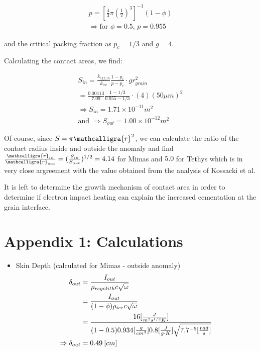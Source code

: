 \documentclass[11pt]{article} %
\newcommand{\sr}{\ensuremath{\mathcalligra{r}} \xspace}
\begin{document}
	\begin{equation}
	\begin{gathered}
	p = [ \frac{4}{3} \pi ( \frac{1}{2})^{3} ]^{-1} (1 - \phi) \\
	\Rightarrow \text{for } \phi = 0.5 \text{, } p = 0.955
	\end{gathered}
	\end{equation}
	
	and the critical packing fraction as $p_{c} = 1/3$ and $g = 4$. 
	
	Calculating the contact areas, we find:
	
	\begin{equation}
	\begin{gathered}
	S_{in} = \frac{k_{eff, in}}{k_{ice}} \frac{1-p_{c}}{p - p_{c}}\cdot g r_{grain}^{2} \\
	= \frac{0.00113}{7.09} \frac{1-1/3}{0.955-1/3} \cdot (4)(50 \mu m)^2 \\
	\Rightarrow S_{in} = 1.71\times 10^{-11} m^{2} \\
	\text{and } \Rightarrow S_{out} = 1.00\times 10^{-12} m^{2}
	\end{gathered}
	\end{equation}
	
	Of course, since $S = \pi \sr^{2}$, we can calculate the ratio of the contact radius inside and outside the anomaly and find $\frac{\sr_{in}}{\sr_{out}} = ( \frac{S_{in}}{S_{out}} )^{1/2} = 4.14$ for Mimas and $5.0$ for Tethys which is in very close argreement with the value obtained from the analysis of Kossacki et al. 
	
	It is left to determine the growth mechanism of contact area in order to determine if electron impact heating can explain the increased cementation at the grain interface.  
	
\section{Appendix 1: Calculations}

\begin{itemize} 
\item Skin Depth (calculated for Mimas - outside anomaly)
\begin{equation}
\begin{split}
\delta_{out} &= \frac{I_{out}}{\rho_{regolith} c \sqrt{\omega}}  \\
&= \frac{I_{out}}{(1-\phi)\rho_ {ice} c \sqrt{\omega}} \\
&= \frac{16[\frac{J}{m^{2} s^{1/2} K}]}{(1-0.5)0.934[\frac{g}{cm^{3}}]0.8[\frac{J}{g \cdot K}]\sqrt{7.7\time10^{-5}[\frac{rad}{s}]}} \\
\Rightarrow \delta_{out}&= 0.49\: [cm]
\end{split}
\end{equation}


\end{itemize}
	
\end{document}
